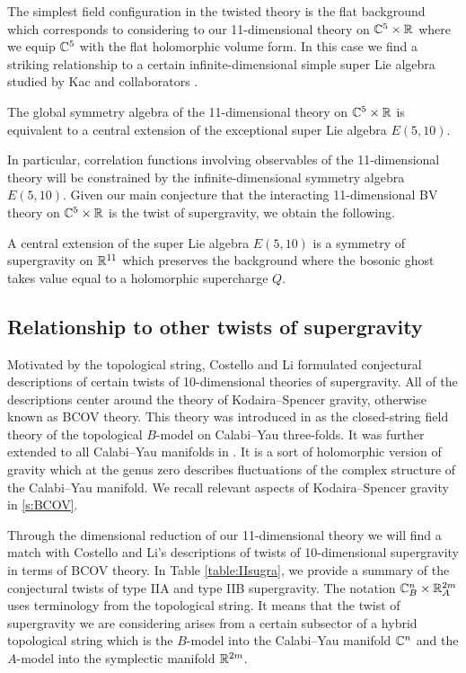 The simplest field configuration in the twisted theory is the flat background which corresponds to considering to our 11-dimensional theory on $\mathbb C^5 \times \mathbb R$ where we equip $\mathbb C^5$ with the flat holomorphic volume form. 
In this case we find a striking relationship to a certain infinite-dimensional simple super Lie algebra studied by Kac and collaborators \cite{KacBible,KacE510}.

\begin{thm}
The global symmetry algebra of the 11-dimensional theory on $\mathbb C^5 \times \mathbb R$ is equivalent to a central extension of the exceptional super Lie algebra $E(5,10)$. 
\end{thm}

In particular, correlation functions involving observables of the 11-dimensional theory will be constrained by the infinite-dimensional symmetry algebra $E(5,10)$. 
Given our main conjecture that the interacting 11-dimensional BV theory on $\mathbb C^5 \times \mathbb R$ is the twist of supergravity, we obtain the following.

\begin{conj} 
A central extension of the super Lie algebra $E(5,10)$ is a symmetry of supergravity on $\mathbb R^{11}$ which preserves the background where the bosonic ghost takes value equal to a holomorphic supercharge $Q$.
\end{conj}

\subsection*{Relationship to other twists of supergravity} 

Motivated by the topological string, Costello and Li formulated conjectural descriptions of certain twists of 10-dimensional theories of supergravity. 
All of the descriptions center around the theory of Kodaira--Spencer gravity, otherwise known as BCOV theory. 
This theory was introduced in \cite{BCOV} as the closed-string field theory of the topological $B$-model on Calabi--Yau three-folds.
It was further extended to all Calabi--Yau manifolds in \cite{CLbcov1}. 
It is a sort of holomorphic version of gravity which at the genus zero  describes fluctuations of the complex structure of the Calabi--Yau manifold. 
We recall relevant aspects of Kodaira--Spencer gravity in \ref{s:BCOV}. 

Through the dimensional reduction of our 11-dimensional theory we will find a match with Costello and Li's descriptions of twists of 10-dimensional supergravity in terms of BCOV theory.
In Table \ref{table:IIsugra}, we provide a summary of the conjectural twists of type IIA and type IIB supergravity. 
The notation $\mathbb C^n_B \times \mathbb R^{2m}_A$ uses terminology from the topological string. 
It means that the twist of supergravity we are considering arises from a certain subsector of a hybrid topological string which is the $B$-model into the Calabi--Yau manifold $\mathbb C^n$ and the $A$-model into the symplectic manifold $\mathbb R^{2m}$. 

